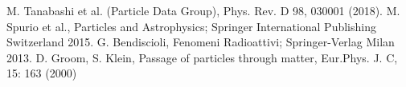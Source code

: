 \begin{thebibliography}{90}             %
\rhead[\fancyplain{}{\bfseries \leftmark}]{\fancyplain{}{\bfseries
\thepage}}
 M. Tanabashi et al. (Particle Data Group), Phys. Rev. D 98, 030001 (2018).
 M. Spurio et al., Particles and Astrophysics; Springer International Publishing Switzerland 2015.
 G. Bendiscioli, Fenomeni Radioattivi; Springer-Verlag Milan 2013.
 D. Groom, S. Klein, Passage of particles through matter, Eur.Phys. J. C, 15: 163 (2000)
\end{thebibliography}

